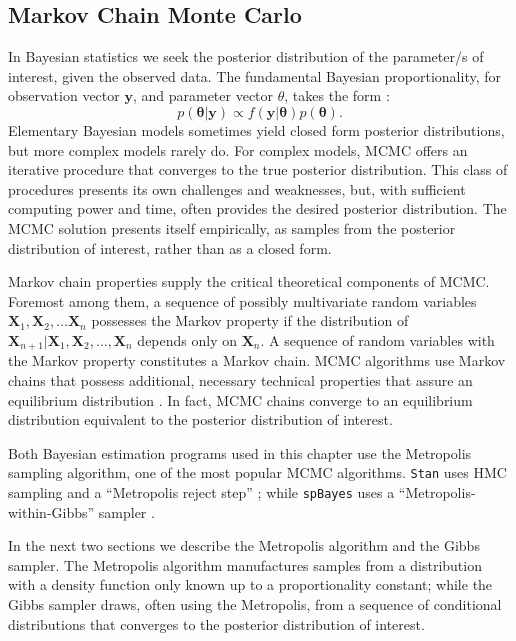 \subsection{Markov Chain Monte Carlo}

In Bayesian statistics we seek the posterior distribution of the parameter/s of interest, given the observed data. The fundamental Bayesian proportionality, for observation vector $\pmb{y}$, and parameter vector $\theta$, takes the form \citep{Gelman2014}:
\begin{equation} \label{eq:bayes}
p(\pmb{\theta}|\pmb{y}) \propto f(\pmb{y}|\pmb{\theta})p(\pmb{\theta}).
\end{equation}
Elementary Bayesian models sometimes yield closed form posterior distributions, but more complex models rarely do. For complex models, MCMC offers an iterative procedure that converges to the true posterior distribution. This class of procedures presents its own challenges and weaknesses, but, with sufficient computing power and time, often provides the desired posterior distribution. The MCMC solution presents itself empirically, as samples from the posterior distribution of interest, rather than as a closed form. 

Markov chain properties supply the critical theoretical components of MCMC. Foremost among them, a sequence of possibly multivariate random variables $\pmb{X}_{1}, \pmb{X}_{2}, \hdots \pmb{X}_{n}$ possesses the Markov property if the distribution of $\pmb{X}_{n+1}|\pmb{X}_{1}, \pmb{X}_{2}, \hdots , \pmb{X}_{n}$ depends only on $\pmb{X}_{n}$. A sequence of random variables with the Markov property constitutes a Markov chain. MCMC algorithms use Markov chains that possess additional, necessary technical properties that assure an equilibrium distribution \citep{Brooks2011}. In fact, MCMC chains converge to an equilibrium distribution equivalent to the posterior distribution of interest.

Both Bayesian estimation programs used in this chapter use the Metropolis sampling algorithm, one of the most popular MCMC algorithms. \verb|Stan| uses HMC sampling and a ``Metropolis reject step'' \citep{STANtheMan}; while \verb|spBayes| uses a ``Metropolis-within-Gibbs'' sampler \citep{Finley2013}. 

In the next two sections we describe the Metropolis algorithm and the Gibbs sampler. The Metropolis algorithm manufactures samples from a distribution with a density function only known up to a proportionality constant; while the Gibbs sampler draws, often using the Metropolis, from a sequence of conditional distributions that converges to the posterior distribution of interest.

